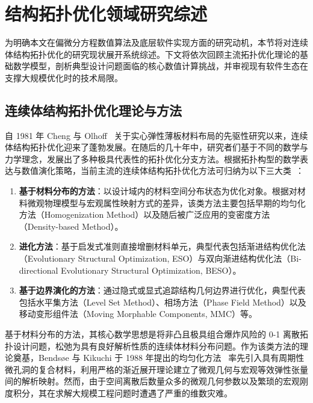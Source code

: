 \section{结构拓扑优化领域研究综述}
\label{sec:literature_review}

为明确本文在偏微分方程数值算法及底层软件实现方面的研究动机，本节将对连续体结构拓扑优化的研究现状展开系统综述。下文将依次回顾主流拓扑优化理论的基础数学模型，剖析典型设计问题面临的核心数值计算挑战，并审视现有软件生态在支撑大规模优化时的技术局限。


\subsection{连续体结构拓扑优化理论与方法}
\label{subsec:continuum_topo_opt_methods}

自 1981 年 Cheng 与 Olhoff~\cite{chengInvestigationConcerningOptimal1981} 关于实心弹性薄板材料布局的先驱性研究以来，连续体结构拓扑优化迎来了蓬勃发展。在随后的几十年中，研究者们基于不同的数学与力学理念，发展出了多种极具代表性的拓扑优化分支方法。根据拓扑构型的数学表达与数值演化策略，当前主流的连续体结构拓扑优化方法可归纳为以下三大类~\cite{rozvanyCriticalReviewEstablished2009, deatonSurveyStructuralMultidisciplinary2014a, JieGouTuoBuYouHuaShuZhiFangFaYanJiuJinZhan}：

\begin{enumerate}
	\item \textbf{基于材料分布的方法}：以设计域内的材料空间分布状态为优化对象。根据对材料微观物理模型与宏观属性映射方式的差异，该类方法主要包括早期的均匀化方法（Homogenization Method）以及随后被广泛应用的变密度方法（Density-based Method）。
	
	\item \textbf{进化方法}：基于启发式准则直接增删材料单元，典型代表包括渐进结构优化法（Evolutionary Structural Optimization, ESO）与双向渐进结构优化法（Bi-directional Evolutionary Structural Optimization, BESO）。
	
	\item \textbf{基于边界演化的方法}：通过隐式或显式追踪结构几何边界进行优化，典型代表包括水平集方法（Level Set Method）、相场方法（Phase Field Method）以及移动变形组件法（Moving Morphable Components, MMC）等。
\end{enumerate}

基于材料分布的方法，其核心数学思想是将非凸且极具组合爆炸风险的 0-1 离散拓扑设计问题，松弛为具有良好解析性质的连续体材料分布问题。作为该类方法的理论奠基，Bendsøe 与 Kikuchi 于 1988 年提出的均匀化方法~\cite{bendsoeGeneratingOptimalTopologies1988} 率先引入具有周期性微孔洞的复合材料，利用严格的渐近展开理论建立了微观几何与宏观等效弹性张量间的解析映射。然而，由于空间离散后数量众多的微观几何参数以及繁琐的宏观刚度积分，其在求解大规模工程问题时遭遇了严重的维数灾难。

